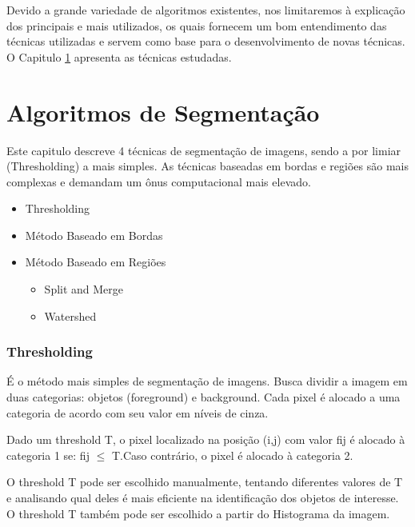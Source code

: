 Devido a  grande variedade de algoritmos existentes, nos limitaremos à explicação dos principais e mais utilizados, os quais fornecem um bom entendimento das técnicas utilizadas e servem como base para o desenvolvimento de novas técnicas. O Capitulo \ref{cap:algoritmos} apresenta as técnicas estudadas.



\chapter{Algoritmos de Segmentação}\label{cap:algoritmos}

Este capitulo descreve 4 técnicas de segmentação de imagens, sendo a por limiar (Thresholding) a mais simples. As técnicas baseadas em bordas e regiões são mais complexas e demandam um ônus computacional mais elevado.

\begin{itemize}
    \item Thresholding
    \item Método Baseado em Bordas 
    \item Método Baseado em Regiões
    \begin{itemize}  
        \item Split and Merge
        \item Watershed
    \end{itemize}
\end{itemize}

\subsection{Thresholding}
É o método mais simples de segmentação de imagens.
Busca dividir a imagem em duas categorias: objetos (foreground) e background. 
Cada pixel é alocado a uma categoria de acordo com seu valor em níveis de cinza.

Dado um threshold T, o pixel localizado na posição (i,j) com valor fij é alocado à categoria 1 se: fij $\leq$ T.Caso contrário, o pixel é alocado à categoria 2.

O threshold T pode ser escolhido manualmente, tentando diferentes valores de T e analisando qual deles é mais eficiente na identificação dos objetos de interesse.
O threshold T também pode ser escolhido a partir do Histograma da imagem.

